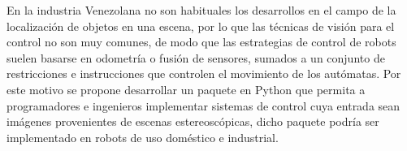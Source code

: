 En la industria Venezolana no son habituales los desarrollos en el campo de la localización de objetos en una escena, por lo que las técnicas de visión para el control no son muy comunes, de modo que las estrategias de control de robots suelen basarse en odometría o fusión de sensores, sumados a un conjunto de restricciones e instrucciones que controlen el movimiento de los autómatas. Por este motivo se propone desarrollar un paquete en Python que permita a programadores e ingenieros implementar sistemas de control cuya entrada sean imágenes provenientes de escenas estereoscópicas, dicho paquete podría ser implementado en robots de uso doméstico e industrial.